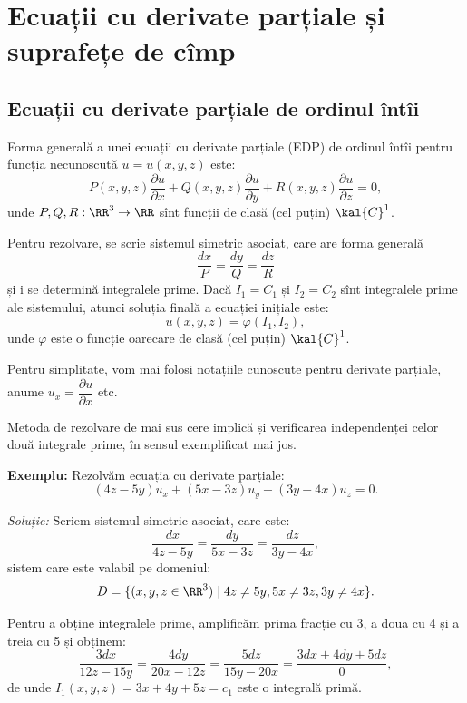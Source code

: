 
\chapter{Ecuații cu derivate parțiale și suprafețe de cîmp}


\section{Ecuații cu derivate parțiale de ordinul întîi}
\indent\indent Forma generală a unei ecuații cu derivate parțiale (EDP) de ordinul
întîi pentru funcția necunoscută $ u = u(x, y, z) $ este:
\[
  P(x, y, z) \dfrac{\partial u}{\partial x} + Q(x, y, z) \dfrac{\partial u}{\partial y} + %
  R(x, y, z) \dfrac{\partial u}{\partial z} = 0,
\]
unde $ P, Q, R : \RR^3 \to \RR $ sînt funcții de clasă (cel puțin) $\kal{C}^1$.

Pentru rezolvare, se scrie sistemul simetric asociat, care are forma generală
\[
  \dfrac{dx}{P} = \dfrac{dy}{Q} = \dfrac{dz}{R}
\]
și i se determină integralele prime. Dacă $ I_1 = C_1 $ și $ I_2 = C_2 $ sînt
integralele prime ale sistemului, atunci soluția finală a ecuației inițiale
este:
\[
  u(x, y, z) = \varphi(I_1, I_2),
\]
unde $ \varphi $ este o funcție oarecare de clasă (cel puțin) $\kal{C}^1$.

\begin{remark}\label{rk:not-dp}
  Pentru simplitate, vom mai folosi notațiile cunoscute pentru derivate parțiale,
  anume $ u_x = \dfrac{\partial u}{\partial x} $ etc.
\end{remark}

\begin{remark}\label{rk:int-indep}
  Metoda de rezolvare de mai sus cere implică și verificarea independenței celor
  două integrale prime, în sensul exemplificat mai jos.
\end{remark}

\textbf{Exemplu:} Rezolvăm ecuația cu derivate parțiale:
\[
  (4z - 5y)u_x + (5x - 3z)u_y + (3y - 4x)u_z = 0.
\]

\emph{Soluție:} Scriem sistemul simetric asociat, care este:
\[
  \dfrac{dx}{4z - 5y} = \dfrac{dy}{5x - 3z} = \dfrac{dz}{3y - 4x},
\]
sistem care este valabil pe domeniul:
\[
  D = \{(x, y, z \in \RR^3) \mid 4z \neq 5y, 5x \neq 3z, 3y \neq 4x \}.
\]

Pentru a obține integralele prime, amplificăm prima fracție cu 3, a doua cu 4 și
a treia cu 5 și obținem:
\[
  \dfrac{3dx}{12z - 15y} = \dfrac{4dy}{20x - 12z} = \dfrac{5dz}{15y - 20x} = %
  \dfrac{3dx + 4dy + 5dz}{0},
\]
de unde $ I_1(x, y, z) = 3x + 4y + 5z = c_1 $ este o integrală primă.

